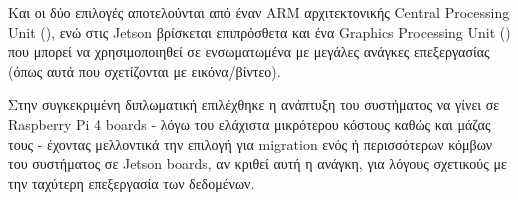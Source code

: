 Και οι δύο επιλογές αποτελούνται από έναν ARM αρχιτεκτονικής Central Processing Unit (), ενώ στις Jetson βρίσκεται επιπρόσθετα και ένα Graphics Processing Unit () που μπορεί να χρησιμοποιηθεί σε ενσωματωμένα με μεγάλες ανάγκες επεξεργασίας (όπως αυτά που σχετίζονται με εικόνα/βίντεο).

\begin{table}[H]
    \caption[]{Raspberry Pi 4 Model B Specifications}
    \label{tab:raspberry-pi-specs}
    \centering
  \end{table}

  Στην συγκεκριμένη διπλωματική επιλέχθηκε η ανάπτυξη του συστήματος να γίνει σε Raspberry Pi 4 boards - λόγω του ελάχιστα μικρότερου κόστους καθώς και μάζας τους - έχοντας μελλοντικά την επιλογή για migration ενός ή περισσότερων κόμβων του συστήματος σε Jetson boards, αν κριθεί αυτή η ανάγκη, για λόγους σχετικούς με την ταχύτερη επεξεργασία των δεδομένων.

